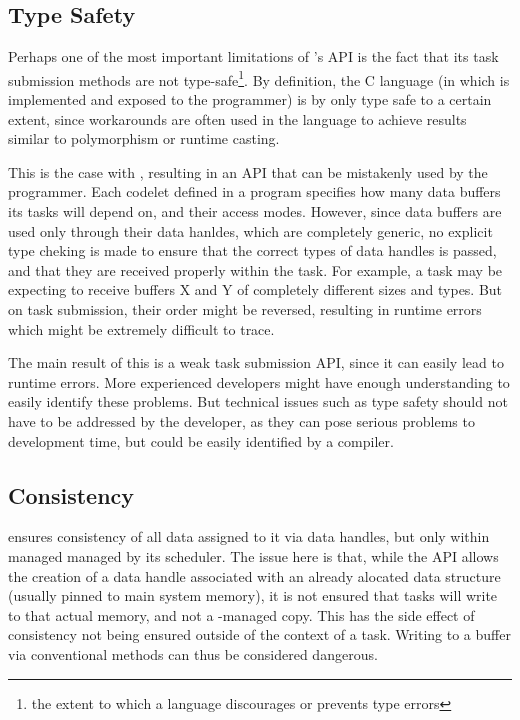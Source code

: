 \documentclass[main.tex]{subfiles}
\begin{document}
\subsection{Type Safety}

Perhaps one of the most important limitations of \starpu's API is the fact that its task submission methods are not type-safe\footnote{the extent to which a language discourages or prevents type errors}. By definition, the C language (in which \starpu is implemented and exposed to the programmer) is by only type safe to a certain extent, since workarounds are often used in the language to achieve results similar to polymorphism or runtime casting.

This is the case with \starpu, resulting in an API that can be mistakenly used by the programmer. Each codelet defined in a program specifies how many data buffers its tasks will depend on, and their access modes. However, since data buffers are used only through their data hanldes, which are completely generic, no explicit type cheking is made to ensure that the correct types of data handles is passed, and that they are received properly within the task. For example, a task may be expecting to receive buffers X and Y of completely different sizes and types. But on task submission, their order might be reversed, resulting in runtime errors which might be extremely difficult to trace.

The main result of this is a weak task submission API, since it can easily lead to runtime errors. More experienced developers might have enough understanding to easily identify these problems. But technical issues such as type safety should not have to be addressed by the developer, as they can pose serious problems to development time, but could be easily identified by a compiler.

\subsection{Consistency}

\starpu ensures consistency of all data assigned to it via data handles, but only within managed managed by its scheduler. The issue here is that, while the API allows the creation of a data handle associated with an already alocated data structure (usually pinned to main system memory), it is not ensured that tasks will write to that actual memory, and not a \starpu-managed copy. This has the side effect of consistency not being ensured outside of the context of a task. Writing to a buffer via conventional methods can thus be considered dangerous.
\end{document}

